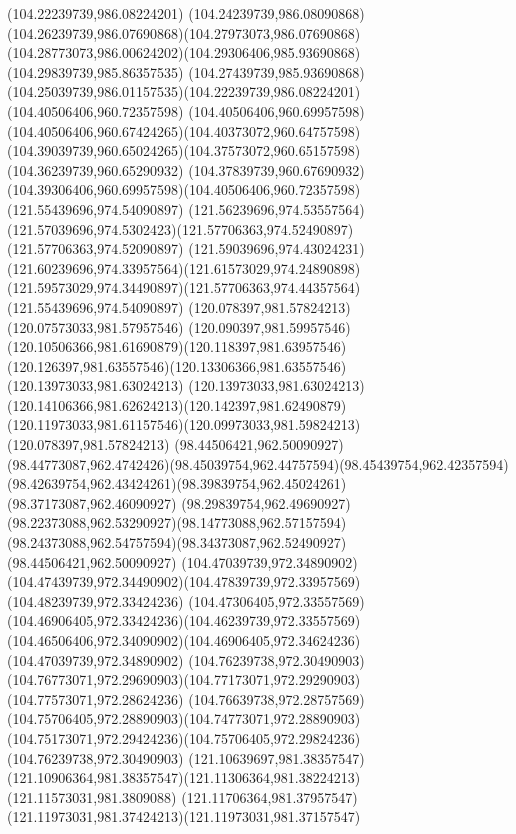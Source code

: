 {{		\moveto(104.22239739,986.08224201)
		\curveto(104.24239739,986.08090868)(104.26239739,986.07690868)(104.27973073,986.07690868)
		\curveto(104.28773073,986.00624202)(104.29306406,985.93690868)(104.29839739,985.86357535)
		\curveto(104.27439739,985.93690868)(104.25039739,986.01157535)(104.22239739,986.08224201)
		\moveto(104.40506406,960.72357598)
		\curveto(104.40506406,960.69957598)(104.40506406,960.67424265)(104.40373072,960.64757598)
		\curveto(104.39039739,960.65024265)(104.37573072,960.65157598)(104.36239739,960.65290932)
		\curveto(104.37839739,960.67690932)(104.39306406,960.69957598)(104.40506406,960.72357598)
		\moveto(121.55439696,974.54090897)
		\curveto(121.56239696,974.53557564)(121.57039696,974.5302423)(121.57706363,974.52490897)
		\lineto(121.57706363,974.52090897)
		\curveto(121.59039696,974.43024231)(121.60239696,974.33957564)(121.61573029,974.24890898)
		\curveto(121.59573029,974.34490897)(121.57706363,974.44357564)(121.55439696,974.54090897)
		\moveto(120.078397,981.57824213)
		\lineto(120.07573033,981.57957546)
		\curveto(120.090397,981.59957546)(120.10506366,981.61690879)(120.118397,981.63957546)
		\curveto(120.126397,981.63557546)(120.13306366,981.63557546)(120.13973033,981.63024213)
		\curveto(120.13973033,981.63024213)(120.14106366,981.62624213)(120.142397,981.62490879)
		\curveto(120.11973033,981.61157546)(120.09973033,981.59824213)(120.078397,981.57824213)
		\moveto(98.44506421,962.50090927)
		\curveto(98.44773087,962.4742426)(98.45039754,962.44757594)(98.45439754,962.42357594)
		\curveto(98.42639754,962.43424261)(98.39839754,962.45024261)(98.37173087,962.46090927)
		\curveto(98.29839754,962.49690927)(98.22373088,962.53290927)(98.14773088,962.57157594)
		\curveto(98.24373088,962.54757594)(98.34373087,962.52490927)(98.44506421,962.50090927)
		\moveto(104.47039739,972.34890902)
		\curveto(104.47439739,972.34490902)(104.47839739,972.33957569)(104.48239739,972.33424236)
		\curveto(104.47306405,972.33557569)(104.46906405,972.33424236)(104.46239739,972.33557569)
		\curveto(104.46506406,972.34090902)(104.46906405,972.34624236)(104.47039739,972.34890902)
		\moveto(104.76239738,972.30490903)
		\curveto(104.76773071,972.29690903)(104.77173071,972.29290903)(104.77573071,972.28624236)
		\curveto(104.76639738,972.28757569)(104.75706405,972.28890903)(104.74773071,972.28890903)
		\curveto(104.75173071,972.29424236)(104.75706405,972.29824236)(104.76239738,972.30490903)
		\moveto(121.10639697,981.38357547)
		\curveto(121.10906364,981.38357547)(121.11306364,981.38224213)(121.11573031,981.3809088)
		\curveto(121.11706364,981.37957547)(121.11973031,981.37424213)(121.11973031,981.37157547)
}}
